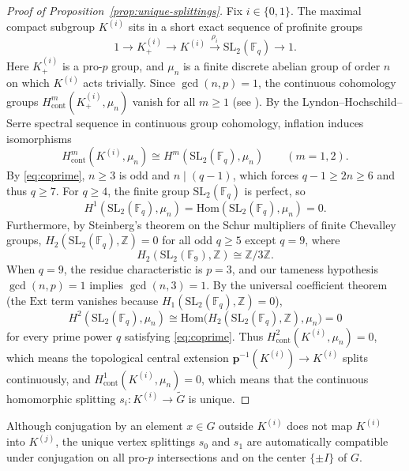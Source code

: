 \documentclass[12pt, letterpaper]{article}
\numberwithin{equation}{section}
\theoremstyle{definition}
\theoremstyle{remark}
\newcommand{\kk}{\mathbb{F}_q}
\newcommand{\Gbar}{\mathrm{SL}_2(\kk)}
\newcommand{\wtG}{\widetilde{G}}
\begin{document}
\begin{proof}[Proof of Proposition~\ref{prop:unique-splittings}]
Fix $i\in\{0,1\}$. The maximal compact subgroup $K^{(i)}$ sits in a short exact sequence of profinite groups
\[
 1\longrightarrow K^{(i)}_+\longrightarrow K^{(i)}\xrightarrow{\,\rho_i\,}\Gbar\longrightarrow 1.
\]
Here $K^{(i)}_+$ is a pro-$p$ group, and $\mu_n$ is a finite discrete abelian group of order $n$ on which $K^{(i)}$ acts trivially. Since $\gcd(n,p)=1$, the continuous cohomology groups $H^m_{\mathrm{cont}}(K^{(i)}_+,\mu_n)$ vanish for all $m\ge 1$ (see \cite[Prop.~2.3]{HW09}). By the Lyndon--Hochschild--Serre spectral sequence in continuous group cohomology, inflation induces isomorphisms
\[
 H^m_{\mathrm{cont}}(K^{(i)},\mu_n)\cong H^m(\Gbar,\mu_n)\qquad (m=1,2).
\]
By \eqref{eq:coprime}, $n\ge 3$ is odd and $n\mid (q-1)$, which forces $q-1\ge 2n\ge 6$ and thus $q\ge 7$. For $q\ge 4$, the finite group $\Gbar$ is perfect, so
\[
 H^1(\Gbar,\mu_n)=\mathrm{Hom}(\Gbar,\mu_n)=0.
\]
Furthermore, by Steinberg's theorem on the Schur multipliers of finite Chevalley groups, $H_2(\Gbar,\mathbb{Z})=0$ for all odd $q\ge 5$ except $q=9$, where
\[
 H_2(\mathrm{SL}_2(\mathbb{F}_9),\mathbb{Z})\cong\mathbb{Z}/3\mathbb{Z}.
\]
When $q=9$, the residue characteristic is $p=3$, and our tameness hypothesis $\gcd(n,p)=1$ implies $\gcd(n,3)=1$. By the universal coefficient theorem (the $\mathrm{Ext}$ term vanishes because $H_1(\Gbar,\mathbb{Z})=0$),
\[
 H^2(\Gbar,\mu_n)\cong \mathrm{Hom}\bigl(H_2(\Gbar,\mathbb{Z}),\mu_n\bigr)=0
\]
for every prime power $q$ satisfying \eqref{eq:coprime}. Thus $H^2_{\mathrm{cont}}(K^{(i)},\mu_n)=0$, which means the topological central extension $\mathbf{p}^{-1}(K^{(i)})\to K^{(i)}$ splits continuously, and $H^1_{\mathrm{cont}}(K^{(i)},\mu_n)=0$, which means that the continuous homomorphic splitting $s_i:K^{(i)}\to\wtG$ is unique.
\end{proof}

Although conjugation by an element $x\in G$ outside $K^{(i)}$ does not map $K^{(i)}$ into $K^{(j)}$, the unique vertex splittings $s_0$ and $s_1$ are automatically compatible under conjugation on all pro-$p$ intersections and on the center $\{\pm I\}$ of $G$.
\end{document}
